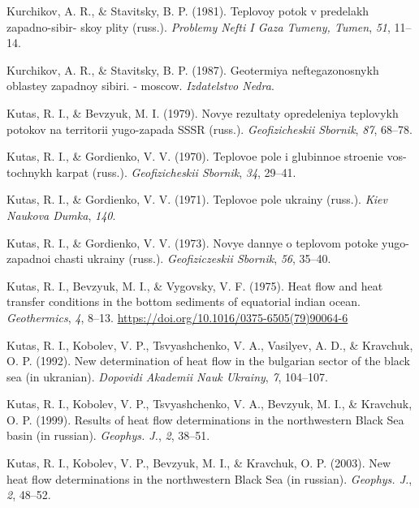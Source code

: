 \documentclass[draft,linenumbers]{agujournal2018}
\begin{document}
\leavevmode{}%
Kurchikov, A. R., \& Stavitsky, B. P. (1981). Teplovoy potok v predelakh
zapadno-sibir- skoy plity (russ.). \emph{Problemy Nefti I Gaza Tumeny,
Tumen}, \emph{51}, 11--14.

\leavevmode{}%
Kurchikov, A. R., \& Stavitsky, B. P. (1987). Geotermiya
neftegazonosnykh oblastey zapadnoy sibiri. - moscow. \emph{Izdatelstvo
Nedra}.

\leavevmode{}%
Kutas, R. I., \& Bevzyuk, M. I. (1979). Novye rezultaty opredeleniya
teplovykh potokov na territorii yugo-zapada SSSR (russ.).
\emph{Geofizicheskii Sbornik}, \emph{87}, 68--78.

\leavevmode{}%
Kutas, R. I., \& Gordienko, V. V. (1970). Teplovoe pole i glubinnoe
stroenie vos- tochnykh karpat (russ.). \emph{Geofizicheskii Sbornik},
\emph{34}, 29--41.

\leavevmode{}%
Kutas, R. I., \& Gordienko, V. V. (1971). Teplovoe pole ukrainy (russ.).
\emph{Kiev Naukova Dumka}, \emph{140}.

\leavevmode{}%
Kutas, R. I., \& Gordienko, V. V. (1973). Novye dannye o teplovom potoke
yugo- zapadnoi chasti ukrainy (russ.). \emph{Geofiziczeskii Sbornik},
\emph{56}, 35--40.

\leavevmode{}%
Kutas, R. I., Bevzyuk, M. I., \& Vygovsky, V. F. (1975). Heat flow and
heat transfer conditions in the bottom sediments of equatorial indian
ocean. \emph{Geothermics}, \emph{4}, 8--13.
\url{https://doi.org/10.1016/0375-6505(79)90064-6}

\leavevmode{}%
Kutas, R. I., Kobolev, V. P., Tsvyashchenko, V. A., Vasilyev, A. D., \&
Kravchuk, O. P. (1992). New determination of heat flow in the bulgarian
sector of the black sea (in ukranian). \emph{Dopovidi Akademii Nauk
Ukrainy}, \emph{7}, 104--107.

\leavevmode{}%
Kutas, R. I., Kobolev, V. P., Tsvyashchenko, V. A., Bevzyuk, M. I., \&
Kravchuk, O. P. (1999). Results of heat flow determinations in the
northwestern {Black Sea} basin (in russian). \emph{Geophys. J.},
\emph{2}, 38--51.

\leavevmode{}%
Kutas, R. I., Kobolev, V. P., Bevzyuk, M. I., \& Kravchuk, O. P. (2003).
New heat flow determinations in the northwestern {Black Sea} (in
russian). \emph{Geophys. J.}, \emph{2}, 48--52.
\end{document}

